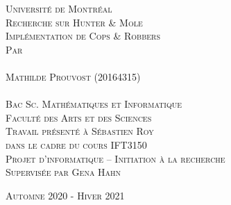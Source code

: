 \documentclass[12pt]{article}
\newcommand{\cp}{Cops \& Robbers\xspace}
\newcommand{\hm}{Hunter \& Mole\xspace}
\begin{document}
\begin{titlepage}
\begin{center}

\textsc{\Large Université de Montréal}\\[4cm]
%
\textsc{\LARGE Recherche sur \hm}\\
\textsc{\LARGE Implémentation de \cp}\\[4cm]
%
\textsc{\Large Par}\\
\textsc{\Large }\\
\textsc{\Large Mathilde Prouvost (20164315)}\\
\textsc{\Large }\\[3cm]
%
\textsc{\Large Bac Sc. Mathématiques et Informatique}\\
\textsc{\Large Faculté des Arts et des Sciences}\\[3.5cm]

\textsc{\Large Travail présenté à Sébastien Roy}\\
\textsc{\Large dans le cadre du cours IFT3150}\\
\textsc{\Large Projet d'informatique -- Initiation à la recherche}\\[.2cm] 
\textsc{\Large Supervisée par Gena Hahn}

\vfill

\textsc{\large Automne 2020 - Hiver 2021}

\end{center}
\end{titlepage}

\begin{abstract}

Les problèmes d'évasion consistent à trouver le nombre minimal de poursuivants nécessaires pour attraper un évadé se déplaçant sur un graphe. 
Alors qu'originalement le projet consistait en de la recherche sur des variantes de ce problème (principalement \cp et \hm), le but de ce projet est finalement d'implémenter une application permettant de visualiser le problème. L'application devra permettre de dessiner un graphe, de le modifier, de positionner des policiers et un voleur et de les faire se déplacer selon les règles.

\end{abstract}

\begin{abstract}

In pursuit-evasion problem, the minimal number of cops needed to find a robber on a graph has to be found. The first goal of my project was to do some research around the \cp problem and its variants (especially the \hm problem). But then it changed to the second goal: implement an app to draw a graph to picture \cp strategies.

\end{abstract}
\end{document}
